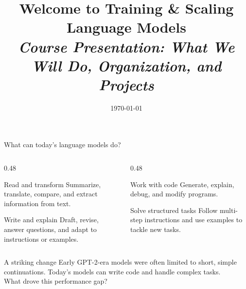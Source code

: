 \documentclass[handout]{beamer}
\title[TASLLM -- Welcome]{Welcome to Training \& Scaling Language Models\\[4pt]
\normalsize\itshape Course Presentation: What We Will Do, Organization, and Projects}
\date{\today}
\begin{document}

\begin{frame}{What can today's language models do?}
  \begin{columns}[c]
    \begin{column}{0.48\linewidth}
      \begin{block}{Read and transform}
        Summarize, translate, compare, and extract information from text.
      \end{block}
      \vspace{5pt}
      \begin{block}{Write and explain}
        Draft, revise, answer questions, and adapt to instructions or examples.
      \end{block}
    \end{column}
    \begin{column}{0.48\linewidth}
      \begin{block}{Work with code}
        Generate, explain, debug, and modify programs.
      \end{block}
      \vspace{5pt}
      \begin{block}{Solve structured tasks}
        Follow multi-step instructions and use examples to tackle new tasks.
      \end{block}
    \end{column}
  \end{columns}
  \vspace{5pt}
  \begin{alertblock}{A striking change}
    Early GPT-2-era models were often limited to short, simple continuations. Today's models can write code and handle complex tasks. \\
    What drove this performance gap?
  \end{alertblock}
\end{frame}
\end{document}
